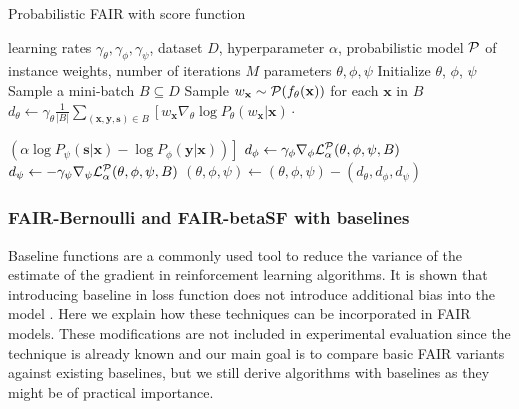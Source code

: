 \documentclass[preprint,12pt]{elsarticle}
\begin{document}
\begin{algorithm}
	\caption{Probabilistic FAIR with score function}
	\label{alg:FAIR-sf}
	\begin{algorithmic}
		 learning rates $\gamma_\theta, \gamma_\phi, \gamma_\psi$, dataset $D$,  hyperparameter $\alpha$, probabilistic model ${\cal P}$ of instance weights, number of iterations $M$
		 parameters $\theta,\phi,\psi$
		\vspace{2mm}
		\State Initialize $\theta$, $\phi$, $\psi$
		\State Sample a mini-batch $B\subseteq D$
		\State Sample $w_\mathbf{x}\sim {\cal P}(f_\theta(\mathbf{x}))$ for each $\mathbf{x}$ in $B$
		\State $d_{\theta} \leftarrow \gamma_\theta\frac{1}{|B|} \sum_{(\mathbf{x},\mathbf{y},\mathbf{s})\in B}\left[w_\mathbf{x}\nabla_{\theta}\log P_\theta(w_\mathbf{x}|\mathbf{x})\cdot\right.$
		
		\hspace{3cm}$\left.(\alpha\log P_\psi(\mathbf{s}|\mathbf{x})-\log P_\phi(\mathbf{y}|\mathbf{x}))\right]$
		\State $d_{\phi} \leftarrow \gamma_\phi\nabla_{\phi}{\cal L}^{\cal P}_\alpha(\theta,\phi,\psi,B)$
		\State $d_{\psi} \leftarrow -\gamma_\psi\nabla_{\psi}{\cal L}^{\cal P}_\alpha(\theta,\phi,\psi,B)$
		\State $(\theta,\phi,\psi) \leftarrow (\theta,\phi,\psi) - (d_{\theta}, d_{\phi}, d_{\psi})$
		\EndFor
	\end{algorithmic}
\end{algorithm}


\subsubsection{FAIR-Bernoulli and FAIR-betaSF with baselines}
\label{app:baselines}

Baseline functions are a commonly used tool to reduce the variance of the estimate of the gradient in reinforcement learning algorithms. It is shown that introducing baseline in loss function does not introduce additional bias into the model \cite{sutton2018reinforcement}. Here we explain how these techniques can be incorporated in FAIR models. These modifications are not included in experimental evaluation since the technique is already known and our main goal is to compare basic FAIR variants against existing baselines, but we still derive algorithms with baselines as they might be of practical importance.
\end{document}

